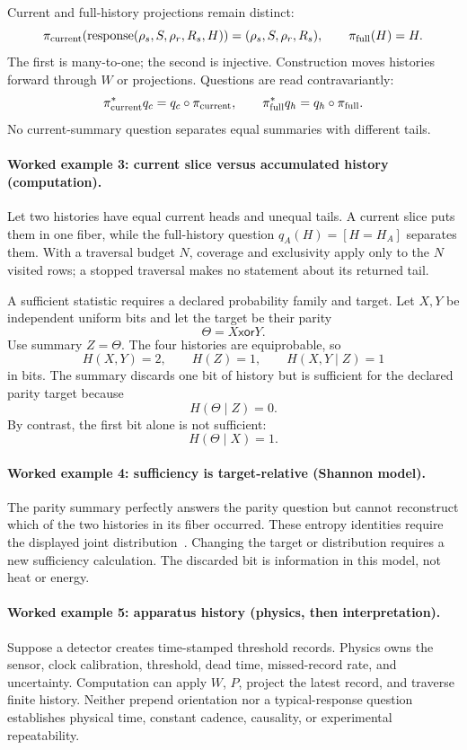 Current and full-history projections remain distinct:
\[
 \pi_{\rm current}(\operatorname{response}(\rho_s,S,\rho_r,R_s,H))
       =(\rho_s,S,\rho_r,R_s),\qquad
 \pi_{\rm full}(H)=H.
\]
The first is many-to-one; the second is injective.  Construction moves histories forward through \(W\) or projections.
Questions are read contravariantly:
\[
 \pi_{\rm current}^*q_c=q_c\circ\pi_{\rm current},\qquad
 \pi_{\rm full}^*q_h=q_h\circ\pi_{\rm full}.
\]
No current-summary question separates equal summaries with different tails.

\paragraph{Worked example 3: current slice versus accumulated history (computation).}
Let two histories have equal current heads and unequal tails.  A current slice puts them in one fiber, while the
full-history question \(q_A(H)=[H=H_A]\) separates them.  With a traversal budget \(N\), coverage and exclusivity apply
only to the \(N\) visited rows; a stopped traversal makes no statement about its returned tail.

A sufficient statistic requires a declared probability family and target.  Let \(X,Y\) be independent uniform bits and
let the target be their parity
\[
                         \Theta=X\mathbin{\mathsf{xor}}Y.
\]
Use summary \(Z=\Theta\).  The four histories are equiprobable, so
\[
 H(X,Y)=2,\qquad H(Z)=1,\qquad H(X,Y\mid Z)=1
\]
in bits.  The summary discards one bit of history but is sufficient for the declared parity target because
\[
                         H(\Theta\mid Z)=0.
\]
By contrast, the first bit alone is not sufficient:
\[
                         H(\Theta\mid X)=1.
\]

\paragraph{Worked example 4: sufficiency is target-relative (Shannon model).}
The parity summary perfectly answers the parity question but cannot reconstruct which of the two histories in its fiber
occurred.  These entropy identities require the displayed joint distribution~\cite{shannon1948}.  Changing the target
or distribution requires a new sufficiency calculation.  The discarded bit is information in this model, not heat or
energy.

\paragraph{Worked example 5: apparatus history (physics, then interpretation).}
Suppose a detector creates time-stamped threshold records.  Physics owns the sensor, clock calibration, threshold,
dead time, missed-record rate, and uncertainty.  Computation can apply \(W\), \(P\), project the latest record, and
traverse finite history.  Neither prepend orientation nor a typical-response question establishes physical time,
constant cadence, causality, or experimental repeatability.

